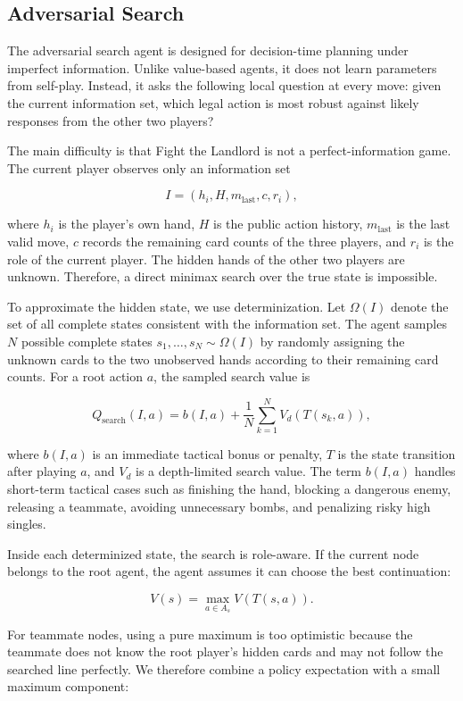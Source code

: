 
\subsection{Adversarial Search}

The adversarial search agent is designed for decision-time planning under
imperfect information. Unlike value-based agents, it does not learn parameters
from self-play. Instead, it asks the following local question at every move:
given the current information set, which legal action is most robust against
likely responses from the other two players?

The main difficulty is that Fight the Landlord is not a perfect-information
game. The current player observes only an information set

\[
    I = (h_i, H, m_{\mathrm{last}}, c, r_i),
\]

where \(h_i\) is the player's own hand, \(H\) is the public action history,
\(m_{\mathrm{last}}\) is the last valid move, \(c\) records the remaining card
counts of the three players, and \(r_i\) is the role of the current player. The
hidden hands of the other two players are unknown. Therefore, a direct minimax
search over the true state is impossible.

To approximate the hidden state, we use determinization. Let
\(\Omega(I)\) denote the set of all complete states consistent with the
information set. The agent samples \(N\) possible complete states
\(s_1,\ldots,s_N \sim \Omega(I)\) by randomly assigning the unknown cards to
the two unobserved hands according to their remaining card counts. For a root
action \(a\), the sampled search value is

\[
    Q_{\mathrm{search}}(I,a)
    =
    b(I,a)
    +
    \frac{1}{N}
    \sum_{k=1}^{N}
    V_d(T(s_k,a)),
\]

where \(b(I,a)\) is an immediate tactical bonus or penalty, \(T\) is the state
transition after playing \(a\), and \(V_d\) is a depth-limited search value. The
term \(b(I,a)\) handles short-term tactical cases such as finishing the hand,
blocking a dangerous enemy, releasing a teammate, avoiding unnecessary bombs,
and penalizing risky high singles.

Inside each determinized state, the search is role-aware. If the current node
belongs to the root agent, the agent assumes it can choose the best continuation:

\[
    V(s) = \max_{a \in A_s} V(T(s,a)).
\]

For teammate nodes, using a pure maximum is too optimistic because the teammate
does not know the root player's hidden cards and may not follow the searched
line perfectly. We therefore combine a policy expectation with a small maximum
component:

